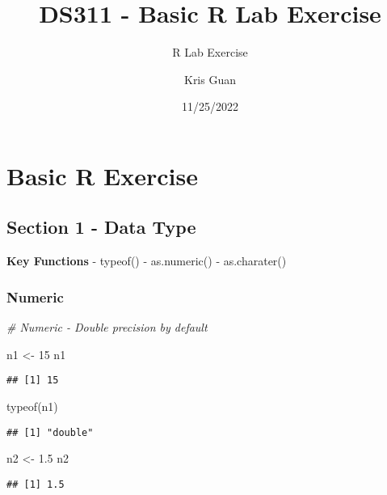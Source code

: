 \documentclass[
]{article}
\title{DS311 - Basic R Lab Exercise}
\subtitle{R Lab Exercise}
\author{Kris Guan}
\date{11/25/2022}
\newenvironment{Shaded}{\begin{snugshade}}{\end{snugshade}}
\newcommand{\CommentTok}[1]{\textcolor[rgb]{0.56,0.35,0.01}{\textit{#1}}}
\newcommand{\DecValTok}[1]{\textcolor[rgb]{0.00,0.00,0.81}{#1}}
\newcommand{\FloatTok}[1]{\textcolor[rgb]{0.00,0.00,0.81}{#1}}
\newcommand{\FunctionTok}[1]{\textcolor[rgb]{0.00,0.00,0.00}{#1}}
\newcommand{\NormalTok}[1]{#1}
\newcommand{\OtherTok}[1]{\textcolor[rgb]{0.56,0.35,0.01}{#1}}
\begin{document}
\maketitle

\hypertarget{basic-r-exercise}{%
\section{Basic R Exercise}\label{basic-r-exercise}}

\hypertarget{section-1---data-type}{%
\subsection{Section 1 - Data Type}\label{section-1---data-type}}

\textbf{Key Functions} - typeof() - as.numeric() - as.charater()

\hypertarget{numeric}{%
\subsubsection{Numeric}\label{numeric}}

\begin{Shaded}
\begin{Highlighting}[]
\CommentTok{\# Numeric {-} Double precision by default}

\NormalTok{n1 }\OtherTok{\textless{}{-}} \DecValTok{15}  
\NormalTok{n1}
\end{Highlighting}
\end{Shaded}

\begin{verbatim}
## [1] 15
\end{verbatim}

\begin{Shaded}
\begin{Highlighting}[]
\FunctionTok{typeof}\NormalTok{(n1)}
\end{Highlighting}
\end{Shaded}

\begin{verbatim}
## [1] "double"
\end{verbatim}

\begin{Shaded}
\begin{Highlighting}[]
\NormalTok{n2 }\OtherTok{\textless{}{-}} \FloatTok{1.5}
\NormalTok{n2}
\end{Highlighting}
\end{Shaded}

\begin{verbatim}
## [1] 1.5
\end{verbatim}
\end{document}
